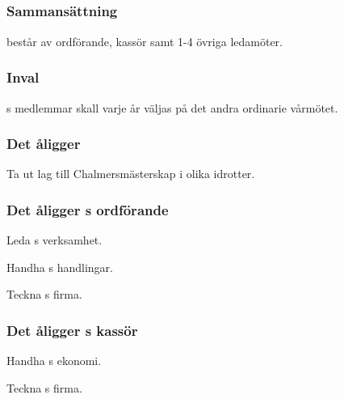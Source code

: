 \subsection{\FRITIDFULL}
\subsubsection{Sammansättning}
\FRITID{} består av ordförande, kassör samt 1-4 övriga ledamöter.

\subsubsection{Inval}
\FRITID{}s medlemmar skall varje år väljas på det andra ordinarie vårmötet.

\subsubsection{Det åligger \FRITID}
\begin{att}
	\item Ta ut lag till Chalmersmästerskap i olika idrotter.
\end{att}

\subsubsection{Det åligger \FRITID{}s ordförande}
\begin{att}
	\item Leda \FRITID{}s verksamhet.
	\item Handha \FRITID{}s handlingar.
	\item Teckna \FRITID{}s firma.
\end{att}

\subsubsection{Det åligger \FRITID{}s kassör}
\begin{att}
	\item Handha \FRITID{}s ekonomi.
	\item Teckna \FRITID{}s firma.
\end{att}